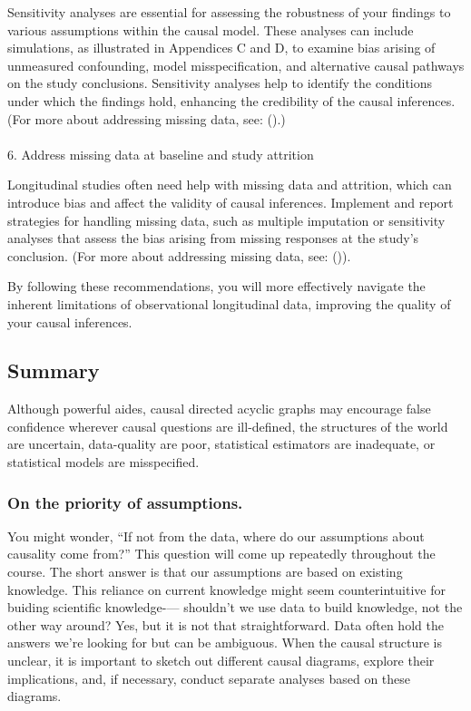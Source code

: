 \documentclass[
  single column]{article}
\makeatletter
\let\oldparagraph\paragraph
\renewcommand{\paragraph}{
    \@ifstar
      \xxxParagraphStar
      \xxxParagraphNoStar
  }
\newcommand{\xxxParagraphStar}[1]{\oldparagraph*{#1}\mbox{}}
\newcommand{\xxxParagraphNoStar}[1]{\oldparagraph{#1}\mbox{}}
\makeatother
\begin{document}
Sensitivity analyses are essential for assessing the robustness of your
findings to various assumptions within the causal model. These analyses
can include simulations, as illustrated in Appendices C and D, to
examine bias arising of unmeasured confounding, model misspecification,
and alternative causal pathways on the study conclusions. Sensitivity
analyses help to identify the conditions under which the findings hold,
enhancing the credibility of the causal inferences. (For more about
addressing missing data, see:
().)

\paragraph{6. Address missing data at baseline and study
attrition}\label{address-missing-data-at-baseline-and-study-attrition}

Longitudinal studies often need help with missing data and attrition,
which can introduce bias and affect the validity of causal inferences.
Implement and report strategies for handling missing data, such as
multiple imputation or sensitivity analyses that assess the bias arising
from missing responses at the study's conclusion. (For more about
addressing missing data, see:
()).

By following these recommendations, you will more effectively navigate
the inherent limitations of observational longitudinal data, improving
the quality of your causal inferences.

\subsection{Summary}\label{summary}

Although powerful aides, causal directed acyclic graphs may encourage
false confidence wherever causal questions are ill-defined, the
structures of the world are uncertain, data-quality are poor,
statistical estimators are inadequate, or statistical models are
misspecified.

\subsubsection{On the priority of
assumptions.}\label{on-the-priority-of-assumptions.}

You might wonder, ``If not from the data, where do our assumptions about
causality come from?'' This question will come up repeatedly throughout
the course. The short answer is that our assumptions are based on
existing knowledge. This reliance on current knowledge might seem
counterintuitive for buiding scientific knowledge-\/--- shouldn't we use
data to build knowledge, not the other way around? Yes, but it is not
that straightforward. Data often hold the answers we're looking for but
can be ambiguous. When the causal structure is unclear, it is important
to sketch out different causal diagrams, explore their implications,
and, if necessary, conduct separate analyses based on these diagrams.
\end{document}
